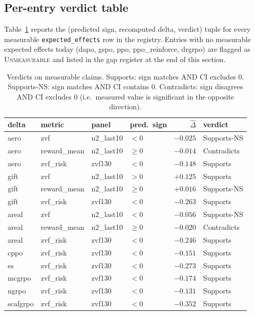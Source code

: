 \documentclass{article}
\begin{document}
\subsection{Per-entry verdict table}
Table~\ref{tab:p6-iter190-verdicts} reports the (predicted sign,
recomputed delta, verdict) tuple for every measurable
\texttt{expected\_effects} row in the registry. Entries with no
measurable expected effects today (dapo, gspo, ppo, ppo\_reinforce,
drgrpo) are flagged as \textsc{Unmeasurable} and listed in the gap
register at the end of this section.

\begin{table}[h]
\centering
\small
\begin{tabular}{llllrl}
\toprule
delta & metric & panel & pred.\ sign & $\hat\Delta$ & verdict \\
\midrule
aero  & zvf          & n2\_last10 & $<$0  & $-0.025$ & Supports-NS \\
aero  & reward\_mean & n2\_last10 & $\ge$0 & $-0.014$ & Contradicts \\
aero  & zvf\_risk    & zvf130     & $<$0  & $-0.148$ & Supports \\
\midrule
gift  & zvf          & n2\_last10 & $>$0  & $+0.125$ & Supports \\
gift  & reward\_mean & n2\_last10 & $\ge$0 & $+0.016$ & Supports-NS \\
gift  & zvf\_risk    & zvf130     & $<$0  & $-0.263$ & Supports \\
\midrule
areal & zvf          & n2\_last10 & $<$0  & $-0.056$ & Supports-NS \\
areal & reward\_mean & n2\_last10 & $\ge$0 & $-0.020$ & Contradicts \\
areal & zvf\_risk    & zvf130     & $<$0  & $-0.246$ & Supports \\
\midrule
cppo  & zvf\_risk    & zvf130     & $<$0  & $-0.151$ &Supports \\
es    & zvf\_risk    & zvf130     & $<$0  & $-0.273$ & Supports \\
mcgrpo& zvf\_risk    & zvf130     & $<$0  & $-0.174$ & Supports \\
ngrpo & zvf\_risk    & zvf130     & $<$0  & $-0.131$ & Supports \\
scafgrpo& zvf\_risk  & zvf130     & $<$0  & $-0.352$ & Supports \\
\bottomrule
\end{tabular}
\caption{Verdicts on measurable claims. Supports: sign matches AND
CI excludes 0. Supports-NS: sign matches AND CI contains 0.
Contradicts: sign disagrees AND CI excludes 0 (i.e.\ measured value is
significant in the opposite direction).}
\label{tab:p6-iter190-verdicts}
\end{table}
\end{document}
